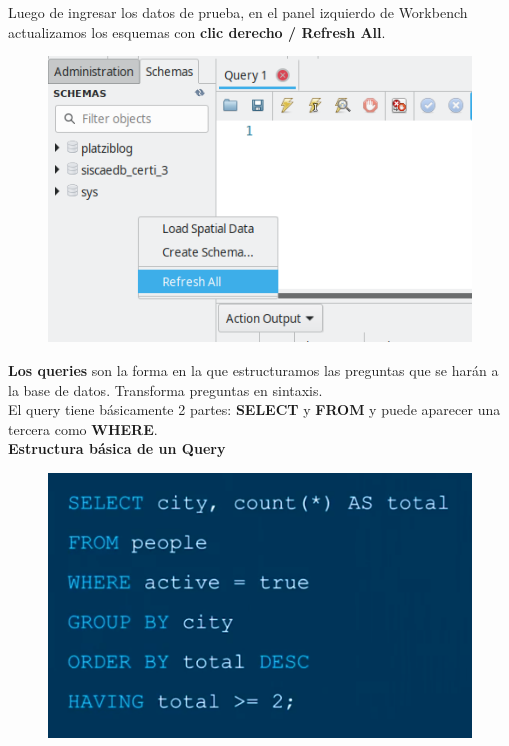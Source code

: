 \documentclass{article}
\begin{document}
\newpage

Luego de ingresar los datos de prueba, en el panel izquierdo de Workbench
actualizamos los esquemas con \textbf{clic derecho / Refresh All}.\\

\begin{figure}[h!]
  \centering
  \includegraphics[scale=0.75]{./Pictures/164_refresh_all_schemas.png}
\end{figure}

\textbf{Los queries} son la forma en la que estructuramos las preguntas que se harán a
la base de datos. Transforma preguntas en sintaxis.\\

El query tiene básicamente 2 partes: \textbf{SELECT} y \textbf{FROM} y puede
aparecer una tercera como \textbf{WHERE}.\\

\textbf{Estructura básica de un Query}
\begin{figure}[h!]
  \centering
  \includegraphics[scale=0.55]{./Pictures/078_query.png}
\end{figure}
\end{document}
